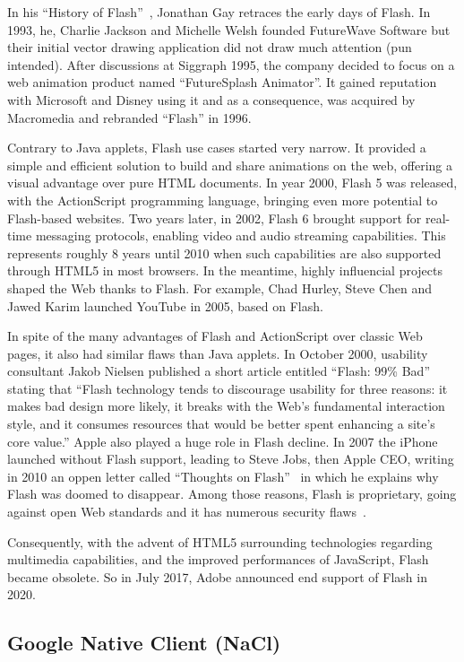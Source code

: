 In his ``History of Flash''~\cite{HistoryFlash}, Jonathan Gay retraces the early days of Flash.
In 1993, he, Charlie Jackson and Michelle Welsh founded FutureWave Software
but their initial vector drawing application did not draw much attention (pun intended).
After discussions at Siggraph 1995, the company decided to focus on a web animation
product named ``FutureSplash Animator''.
It gained reputation with Microsoft and Disney using it and as a consequence,
was acquired by Macromedia and rebranded ``Flash'' in 1996.

Contrary to Java applets, Flash use cases started very narrow.
It provided a simple and efficient solution to build and share animations on the web,
offering a visual advantage over pure HTML documents.
In year 2000, Flash 5 was released, with the ActionScript programming language,
bringing even more potential to Flash-based websites.
Two years later, in 2002, Flash 6 brought support for real-time messaging protocols,
enabling video and audio streaming capabilities.
This represents roughly 8 years until 2010 when such capabilities are also
supported through HTML5 in most browsers.
In the meantime, highly influencial projects shaped the Web thanks to Flash.
For example, Chad Hurley, Steve Chen and Jawed Karim launched
YouTube in 2005, based on Flash.

In spite of the many advantages of Flash and ActionScript over classic Web pages,
it also had similar flaws than Java applets.
In October 2000, usability consultant Jakob Nielsen published a short article
entitled ``Flash: 99\% Bad''~\cite{FlashBadNielsen} stating that
``Flash technology tends to discourage usability for three reasons:
it makes bad design more likely,
it breaks with the Web's fundamental interaction style,
and it consumes resources that would be better spent enhancing a site's core value.''
Apple also played a huge role in Flash decline.
In 2007 the iPhone launched without Flash support,
leading to Steve Jobs, then Apple CEO, writing in 2010 an oppen letter called
``Thoughts on Flash''~\cite{FlashJobs}
in which he explains why Flash was doomed to disappear.
Among those reasons, Flash is proprietary, going against open Web standards
and it has numerous security flaws~\cite{FlashCVE}.

Consequently, with the advent of HTML5 surrounding technologies regarding multimedia capabilities,
and the improved performances of JavaScript, Flash became obsolete.
So in July 2017, Adobe announced end support of Flash in 2020.

\subsection{Google Native Client (NaCl)}%
\label{sub:nacl}

